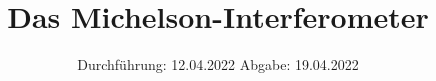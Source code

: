 

\subject{VERSUCH 401}
\title{Das Michelson-Interferometer}
\date{%
  Durchführung: 12.04.2022
  \hspace{3em}
  Abgabe: 19.04.2022
}



\maketitle
\thispagestyle{empty}
\tableofcontents
\newpage







\printbibliography{}


